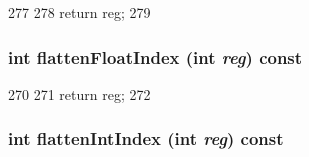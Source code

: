 \begin{DoxyCode}
277         {
278             return reg;
279         }
\end{DoxyCode}
\hypertarget{structArmISA_1_1ISA_a85addcd4f57c5a0ffa81805dcad1eeb7}{
\subsubsection[{flattenFloatIndex}]{\setlength{\rightskip}{0pt plus 5cm}int flattenFloatIndex (int {\em reg}) const}}
\label{structArmISA_1_1ISA_a85addcd4f57c5a0ffa81805dcad1eeb7}



\begin{DoxyCode}
270         {
271             return reg;
272         }
\end{DoxyCode}
\hypertarget{structArmISA_1_1ISA_aece4b88ffcab608652e8e9f0fbe643d4}{
\subsubsection[{flattenIntIndex}]{\setlength{\rightskip}{0pt plus 5cm}int flattenIntIndex (int {\em reg}) const}}
\label{structArmISA_1_1ISA_aece4b88ffcab608652e8e9f0fbe643d4}



